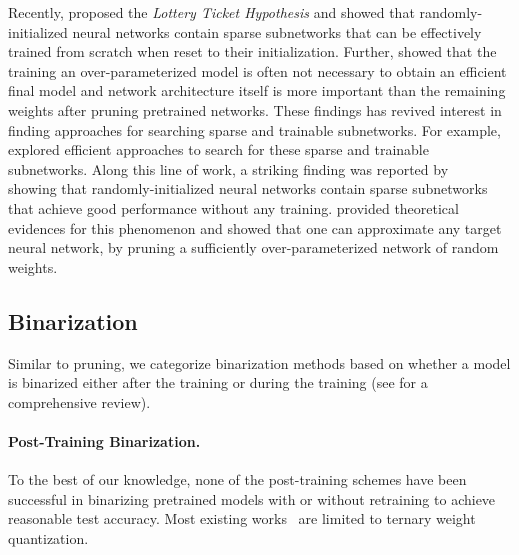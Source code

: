 \documentclass{article} \usepackage{iclr2021_conference,times}
\begin{document}
Recently, \citep{frankle2018lottery} proposed the \emph{Lottery Ticket Hypothesis} and showed that  randomly-initialized neural networks contain sparse subnetworks that can be effectively trained from scratch when reset to their initialization.
Further, \citep{liu2018rethinking} showed that the training an over-parameterized model is often not necessary to obtain an efficient final model and network architecture itself is more important than the remaining weights after pruning pretrained networks. These findings has revived interest in finding approaches for searching sparse and trainable subnetworks. For example, \citep{lee2018snip, 2wang2020pruning, you2019drawing, 1wang2020picking} explored efficient approaches to search for these sparse and trainable subnetworks.
Along this line of work, a striking finding was reported by
~\citep{zhou2019deconstructing, ramanujan2019whats} showing that randomly-initialized neural networks contain sparse subnetworks that achieve good performance without any training.
\citep{malach2020proving, pensia2020optimal} provided theoretical evidences for this phenomenon and showed that one can approximate any target neural network, by pruning a sufficiently over-parameterized network of random weights.



\subsection{Binarization}
Similar to pruning, we categorize binarization methods based on whether a model is binarized either after the training or during the training (see \citep{qin2020binary} for a comprehensive review).

\paragraph{Post-Training Binarization.}
To the best of our knowledge, none of the post-training schemes have been successful in binarizing pretrained models with or without retraining to achieve reasonable test accuracy. Most existing works~\citep{han2015deep, zhou2017incremental} are limited to ternary weight quantization.
\end{document}
